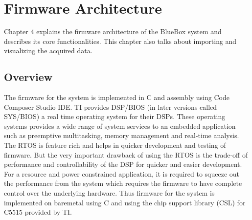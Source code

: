 \chapter{Firmware Architecture}

Chapter 4 explains the firmware architecture of the BlueBox system and describes its core functionalities. This chapter also talks about importing and visualizing the acquired data.

\section{Overview}
The firmware for the system is implemented in C and assembly using Code Composer Studio IDE. TI provides DSP/BIOS (in later versions called SYS/BIOS)  a real time operating system for their DSPs. These operating systems provides a wide range of system services to an embedded application such as preemptive multitasking, memory management and real-time analysis. The RTOS is feature rich and helps in quicker development and testing of firmware. But the very important drawback of using the RTOS is the trade-off of performance and controllability of the DSP for quicker and easier development. For a resource and power constrained application, it is required to squeeze out the performance from the system which requires the firmware to have complete control over the underlying hardware. Thus firmware for the system is implemented on baremetal using  C and using the chip support library (CSL) for C5515 provided by TI. 


\vfill

